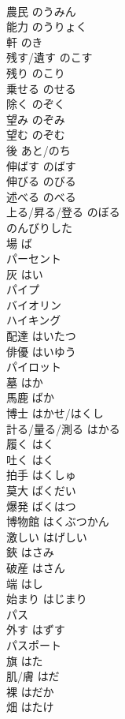 \documentclass[8pt]{extreport}
\begin{document}
\begin{CJK}{UTF8}{min}
\\	農民	のうみん	
\\	能力	のうりょく	
\\	軒	のき	
\\	残す/遺す	のこす	
\\	残り	のこり	
\\	乗せる	のせる	
\\	除く	のぞく	
\\	望み	のぞみ	
\\	望む	のぞむ	
\\	後	あと/のち	
\\	伸ばす	のばす	
\\	伸びる	のびる	
\\	述べる	のべる	
\\	上る/昇る/登る	のぼる	
\\	のんびりした		
\\	場	ば	
\\	パーセント		
\\	灰	はい	
\\	パイプ		
\\	バイオリン		
\\	ハイキング		
\\	配達	はいたつ	
\\	俳優	はいゆう	
\\	パイロット		
\\	墓	はか	
\\	馬鹿	ばか	
\\	博士	はかせ/はくし	
\\	計る/量る/測る	はかる	
\\	履く	はく	
\\	吐く	はく	
\\	拍手	はくしゅ	
\\	莫大	ばくだい	
\\	爆発	ばくはつ	
\\	博物館	はくぶつかん	
\\	激しい	はげしい	
\\	鋏	はさみ	
\\	破産	はさん	
\\	端	はし	
\\	始まり	はじまり	
\\	パス		
\\	外す	はずす	
\\	パスポート		
\\	旗	はた	
\\	肌/膚	はだ	
\\	裸	はだか	
\\	畑	はたけ	

\end{CJK}
\end{document}
